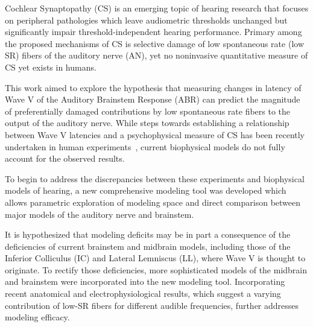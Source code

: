 Cochlear Synaptopathy (CS) is an emerging topic of hearing research that focuses on peripheral pathologies which leave audiometric thresholds unchanged but significantly impair threshold-independent hearing performance. Primary among the proposed mechanisms of CS is selective damage of low spontaneous rate (low SR) fibers of the auditory nerve (AN), yet no noninvasive quantitative measure of CS yet exists in humans.

This work aimed to explore the hypothesis that measuring changes in latency of Wave V of the Auditory Brainstem Response (ABR) can predict the magnitude of preferentially damaged contributions by low spontaneous rate fibers to the output of the auditory nerve. While steps towards establishing a relationship between Wave V latencies and a psychophysical measure of CS has been recently undertaken in human experiments~\citep{Mehraei2016Auditory}, current biophysical models do not fully account for the observed results.

To begin to address the discrepancies between these experiments and biophysical models of hearing, a new comprehensive modeling tool was developed which allows parametric exploration of modeling space and direct comparison between major models of the auditory nerve and brainstem. 

It is hypothesized that modeling deficits may be in part a consequence of the deficiencies of current brainstem and midbrain models, including those of the Inferior Colliculus (IC) and Lateral Lemniscus (LL), where Wave V is thought to originate.  To rectify those deficiencies, more sophisticated models of the midbrain and brainstem were incorporated into the new modeling tool. Incorporating recent anatomical and electrophysiological results, which suggest a varying contribution of low-SR fibers for different audible frequencies, further addresses modeling efficacy.
